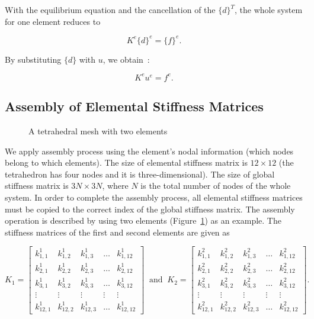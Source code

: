 \noindent With the equilibrium equation and the cancellation of the $\{d\}^T$, the whole system for one element reduces to

\begin{equation}
K^e \{d\}^e = \{f\}^e.
\label{eqn:3.12}
\end{equation}

\noindent By substituting $\{d\}$ with $u$, we obtain~\cite{Logan07}:

\begin{equation}
K^e u^e = f^e.
\label{eqn:3.13}
\end{equation}

\subsection{Assembly of Elemental Stiffness Matrices}

\begin{figure}[h]
\centerline{}
\caption{A tetrahedral mesh with two elements}
\label{fig:asmbl}
\end{figure}

We apply assembly process using the element's nodal information (which nodes belong to which elements). The size of elemental stiffness matrix is $12 \times 12$ (the tetrahedron has four nodes and it is three-dimensional). The size of global stiffness matrix is $3N \times 3N$, where $N$ is the total number of nodes of the whole system.
In order to complete the assembly process, all elemental stiffness matrices must be copied to the correct index of the global stiffness matrix. The assembly operation is described by using two elements (Figure~\ref{fig:asmbl}) as an example. The stiffness matrices of the first and second elements are given as

\begin{equation}
K_1
 =
\begin{bmatrix}
k^{1}_{1,1} & k^{1}_{1,2} & k^{1}_{1,3} & \hdots & k^{1}_{1,12} \\
k^{1}_{2,1} & k^{1}_{2,2} & k^{1}_{2,3} & \hdots & k^{1}_{2,12} \\
k^{1}_{3,1} & k^{1}_{3,2} & k^{1}_{3,3} & \hdots & k^{1}_{3,12} \\
\vdots  & \vdots  & \vdots  & \vdots & \vdots   \\
k^{1}_{12,1} & k^{1}_{12,2} & k^{1}_{12,3} & \hdots & k^{1}_{12,12}
\end{bmatrix} \;\;\text{and}\;\;
K_2
 =
\begin{bmatrix}
k^{2}_{1,1} & k^{2}_{1,2} & k^{2}_{1,3} & \hdots & k^{2}_{1,12} \\
k^{2}_{2,1} & k^{2}_{2,2} & k^{2}_{2,3} & \hdots & k^{2}_{2,12} \\
k^{2}_{3,1} & k^{2}_{3,2} & k^{2}_{3,3} & \hdots & k^{2}_{3,12} \\
\vdots  & \vdots  & \vdots  & \vdots & \vdots   \\
k^{2}_{12,1} & k^{2}_{12,2} & k^{2}_{12,3} & \hdots & k^{2}_{12,12}
\end{bmatrix}.
\label{eqn:element1_2}
\end{equation}


